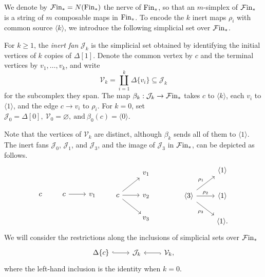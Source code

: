 \documentclass[10pt,reqno]{amsart}
\begin{document}
We denote by $\mathcal{F}\mathrm{in}_*=N(\mathrm{Fin}_*)$ the nerve of $\mathrm{Fin}_*$, so that an
$m$-simplex of $\mathcal{F}\mathrm{in}_*$ is a string of $m$ composable maps in
$\mathrm{Fin}_*$. To encode the $k$ inert maps $\rho_i$ with common source
$\langle k\rangle$, we introduce the following simplicial set over
$\mathcal{F}\mathrm{in}_*$.

\begin{definition}
\label{def:inert_fan}
For $k\geq1$, the \emph{inert fan} $\mathcal J_k$ is the
simplicial set obtained by identifying the initial vertices of $k$
copies of $\Delta[1]$. Denote the common vertex by $c$ and the
terminal vertices by $v_1,\ldots,v_k$, and write
\[
\mathcal V_k=\coprod_{i=1}^k\Delta\{v_i\}\subseteq\mathcal J_k
\]
for the subcomplex they span.
The map $\beta_k:\mathcal J_k\to\mathcal{F}\mathrm{in}_*$ takes $c$ to
$\langle k\rangle$, each $v_i$ to $\langle1\rangle$, and
the edge $c\to v_i$ to $\rho_i$. For $k=0$, set
$
\mathcal J_0=\Delta[0],\ \mathcal V_0=\varnothing,
\ \text{and} \ \beta_0(c)=\langle0\rangle.
$
\end{definition}

Note that the vertices of $\mathcal V_k$ are distinct, although
$\beta_k$ sends all of them to $\langle1\rangle$. The inert fans
$\mathcal J_0$, $\mathcal J_1$, and $\mathcal J_3$, and the image
of $\mathcal J_3$ in $\mathcal{F}\mathrm{in}_*$, can be depicted as follows.
\[
\begin{tikzcd}[ampersand replacement=\&]c\end{tikzcd}
\qquad
\begin{tikzcd}[ampersand replacement=\&]c\arrow[r]\&v_1\end{tikzcd}
\qquad
\begin{tikzcd}[ampersand replacement=\&]
\&v_1\\c\arrow[ur]\arrow[r]\arrow[dr]\&v_2\\\&v_3
\end{tikzcd}
\qquad \qquad
\begin{tikzcd}[ampersand replacement=\&]
\&\langle1\rangle\\
\langle3\rangle\arrow[ur,"\rho_1"]\arrow[r,"\rho_2"]
\arrow[dr,"\rho_3"']\&\langle1\rangle\\\&\langle1\rangle.
\end{tikzcd}
\]
We will consider the restrictions along the inclusions of simplicial
sets over $\mathcal{F}\mathrm{in}_*$
\[
\begin{tikzcd}[ampersand replacement=\&]
\Delta\{c\}\arrow[r,hook]\&\mathcal J_k
\&\mathcal V_k\arrow[l,hook],
\end{tikzcd}
\]
where the left-hand inclusion is the identity when $k=0$.
\end{document}
